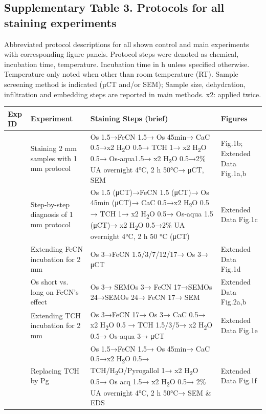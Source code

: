 \documentclass{article}
\begin{document}
\subsection*{Supplementary Table 3. Protocols for all staining experiments}

Abbreviated protocol descriptions for all shown control and main experiments with corresponding figure panels. Protocol steps were denoted as chemical, incubation time, temperature. Incubation time in h unless specified otherwise. Temperature only noted when other than room temperature (RT). Sample screening method is indicated (µCT and/or SEM); Sample size, dehydration, infiltration and embedding steps are reported in main methods. x2: applied twice. 

\begin{longtable}{>{\raggedright\arraybackslash}p{0.6cm}>{\raggedright\arraybackslash}p{3cm}>{\raggedright\arraybackslash}p{7.3cm}>{\raggedright\arraybackslash}p{2.2cm}}
\toprule
\textbf{Exp ID} & \textbf{Experiment} & \textbf{Staining Steps (brief)} & \textbf{Figures} \\
\midrule
\endhead
1 & Staining 2 mm samples with 1 mm protocol & Os 1.5→FeCN 1.5→ Os 45min→ CaC 0.5→x2 H\textsubscript{2}O 0.5→ TCH 1→ x2 H\textsubscript{2}O 0.5→ Os-aqua1.5→ x2 H\textsubscript{2}O 0.5→2\% UA overnight 4°C, 2 h 50°C→ μCT, SEM & Fig.1b; Extended Data Fig.1a,b \\ \midrule
2 & Step-by-step diagnosis of 1 mm protocol & Os 1.5 (μCT)→FeCN 1.5 (μCT)→ Os 45min (μCT)→ CaC 0.5→x2 H\textsubscript{2}O 0.5 → TCH 1→ x2 H\textsubscript{2}O 0.5→ Os-aqua 1.5 (μCT)→ x2 H\textsubscript{2}O 0.5→2\% UA overnight 4°C, 2 h 50 °C (μCT) & Extended Data Fig.1c \\ \midrule
3 & Extending FeCN incubation for 2 mm & Os 3→FeCN 1.5/3/7/12/17→ Os 3→ μCT & Extended Data Fig.1d \\ \midrule
4 & Os short vs. long on FeCN’s effect & Os 3→ SEM\newline Os 3→ FeCN 17→SEM\newline Os 24→SEM\newline Os 24→ FeCN 17→ SEM & Extended Data Fig.2a,b \\ \midrule
5 & Extending TCH incubation for 2 mm & Os 3→FeCN 17→ Os 3→ CaC 0.5→ x2 H\textsubscript{2}O 0.5 → TCH 1.5/3/5→ x2 H\textsubscript{2}O 0.5→ Os-aqua 3→ μCT & Extended Data Fig.1e \\ \midrule
6 & Replacing TCH by Pg & Os 1.5→FeCN 1.5→ Os 45min→ CaC 0.5→x2 H\textsubscript{2}O 0.5→ TCH/H\textsubscript{2}O/Pyrogallol 1→ x2 H\textsubscript{2}O 0.5→ Os acq 1.5→ x2 H\textsubscript{2}O 0.5→ 2\% UA overnight 4°C, 2 h 50°C→ SEM \& EDS & Extended Data Fig.1f \\ \midrule

\end{longtable}
\end{document}
